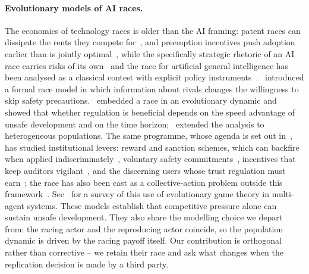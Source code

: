 \documentclass[pdflatex]{sn-jnl}
\theoremstyle{thmstyleone}
\theoremstyle{thmstylethree}
\theoremstyle{thmstyletwo}
\begin{document}
\paragraph{Evolutionary models of AI races.}
The economics of technology races is older than the AI framing: patent races
can dissipate the rents they
compete for~\citep{loury1979market}, and preemption incentives push adoption
earlier than is jointly optimal~\citep{fudenberg1985preemption}, while the
specifically strategic rhetoric of an AI race carries risks of its
own~\citep{cave2018race} and the race for artificial general intelligence has
been analysed as a classical contest with explicit policy
instruments~\citep{naude2020race}.~\citet{armstrong2016precipice} introduced a formal
race model in which
information about rivals changes the willingness to skip safety precautions.~\citet{han2020regulate} embedded a race in an evolutionary dynamic and showed
that whether regulation is beneficial depends on the speed advantage of unsafe
development and on the time horizon;~\citet{cimpeanu2022heterogeneous}
extended the analysis to heterogeneous populations. The same programme, whose
agenda is set out in~\citet{han2019bidding}, has studied institutional levers:
reward and sanction schemes, which can backfire when applied
indiscriminately~\citep{han2021mediating}, voluntary safety
commitments~\citep{han2022voluntary}, incentives that keep auditors
vigilant~\citep{bova2024vigilant}, and the discerning users whose trust
regulation must earn~\citep{alalawi2026trust}; the race has also been cast as a
collective-action problem outside this framework~\citep{lacroix2022tragedy}.
See~\citet{han2022emergent}
for a survey of this use of evolutionary game theory in multi-agent systems.
These models establish
that competitive pressure alone can sustain unsafe development. They also
share the modelling choice we depart from: the racing actor and the
reproducing actor coincide, so the population dynamic is driven by the racing
payoff itself. Our contribution is orthogonal rather than corrective -- we
retain their race and ask what changes when the replication decision is made
by a third party.
\end{document}
